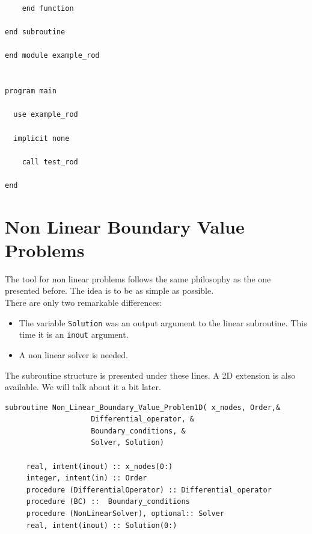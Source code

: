 \begin{blueframed}
\begin{lstlisting}
    end function

end subroutine

end module example_rod


program main

  use example_rod

  implicit none

	call test_rod

end

\end{lstlisting}

\end{blueframed}

\newpage

\section{Non Linear Boundary Value Problems}

The tool for non linear problems follows the same philosophy as the one
presented before. The idea is to be as simple as possible. \\

There are only two remarkable differences: 

\begin{itemize}
  \item The variable \texttt{Solution} was an output argument to the linear
  subroutine. This time it is an \texttt{inout} argument. 
  \item A non linear solver is needed.
\end{itemize}

The subroutine structure is presented under these lines. A 2D extension is also
available. We will talk about it a bit later. 

\begin{blueframed}
\begin{lstlisting}
subroutine Non_Linear_Boundary_Value_Problem1D( x_nodes, Order,&
					Differential_operator, &
					Boundary_conditions, &
					Solver, Solution)

     real, intent(inout) :: x_nodes(0:)
     integer, intent(in) :: Order
     procedure (DifferentialOperator) :: Differential_operator
     procedure (BC) ::  Boundary_conditions
     procedure (NonLinearSolver), optional:: Solver
     real, intent(inout) :: Solution(0:)

\end{lstlisting}

\end{blueframed}

